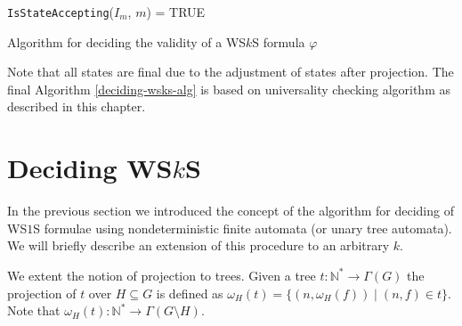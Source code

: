 \begin{algorithm}[ht!]
		\BlankLine
		\nl \Return \texttt{IsStateAccepting}($I_m$, $m$) = \textsc{TRUE}
		\BlankLine
		\caption{Algorithm for deciding the validity of a WS$k$S
		formula $\varphi$}\label{deciding-wsks-alg}
	\end{algorithm}

Note that all states are final due to the adjustment of states after projection.
The final Algorithm \ref{deciding-wsks-alg} is based on universality checking
algorithm as described in this chapter.

%    

\section{Deciding WS$k$S}

In the previous section we introduced the concept of the algorithm for deciding
of WS$1$S formulae using nondeterministic finite automata (or unary tree
automata).
We will briefly describe an extension of this procedure to an arbitrary $k$.

We extent the notion of projection to trees. Given a tree $t :
\mathbb{N}^* \rightarrow \Gamma(G)$ the projection of $t$ over $H \subseteq G$
is defined as $\omega_H(t) = \{(n, \omega_H(f)) \mid (n, f) \in t\}$. Note that
$\omega_H(t) : \mathbb{N}^* \rightarrow \Gamma(G\setminus H)$.

